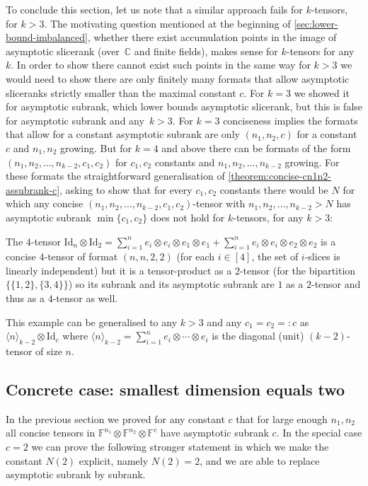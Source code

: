 \documentclass{daj}
\newcommand{\FF}{\mathbb{F}}
\newcommand{\CC}{\mathbb{C}}
\newcommand{\id}{\mathrm{Id}}
\begin{document}
\begin{remark}
    To conclude this section, let us note that a similar approach fails for $k$-tensors, for $k>3$. The motivating question mentioned at the beginning of \autoref{sec:lower-bound-imbalanced}, whether there exist accumulation points in the image of asymptotic slicerank (over~$\CC$ and finite fields), makes sense for $k$-tensors for any $k$. In order to show there cannot exist such points in the same way for $k>3$ we would need to show there are only finitely many formats that allow asymptotic sliceranks strictly smaller than the maximal constant $c$. For $k=3$ we showed it for asymptotic subrank, which lower bounds asymptotic slicerank, but this is false for asymptotic subrank and any~$k>3$. For $k=3$ conciseness implies the formats that allow for a constant asymptotic subrank are only $(n_1,n_2,c)$ for a constant $c$ and $n_1,n_2$ growing. But for $k=4$ and above there can be formats of the form $(n_1,n_2,\dots,n_{k-2},c_1,c_2)$ for $c_1,c_2$ constants and $n_1,n_2,\dots,n_{k-2}$ growing. For these formats the straightforward generalisation 
    of \autoref{theorem:concise-cn1n2-assubrank-c}, asking to show that for every $c_1,c_2$ constants there would be $N$ for which any concise $(n_1,n_2,\dots,n_{k-2},c_1,c_2)$-tensor with $n_1,n_2,\dots,n_{k-2}>N$ has asymptotic subrank $\min\{c_1,c_2\}$ does not hold for $k$-tensors, for any $k>3$:
    
    The $4$-tensor $\id_n\otimes \id_2=\sum_{i=1}^n e_i\otimes e_i\otimes e_1\otimes e_1+\sum_{i=1}^n e_i\otimes e_i\otimes e_2\otimes e_2$ is a concise $4$-tensor of format $(n,n,2,2)$ (for each $i\in[4]$, the set of $i$-slices is linearly independent) but it is a tensor-product as a $2$-tensor (for the bipartition $\{\{1,2\},\{3,4\}\}$) so its subrank and its asymptotic subrank are $1$ as a $2$-tensor and thus as a $4$-tensor as well.
    
    This example can be generalised to any $k>3$ and any $c_1=c_2=:c$ as $\langle n\rangle_{k-2}\otimes \id_c$ where $\langle n\rangle_{k-2}=\sum_{i=1}^n e_i\otimes\cdots\otimes e_i$ is the diagonal (unit) $(k-2)$-tensor of size $n$.
\end{remark}


\subsection{Concrete case: smallest dimension equals two} %
\label{subsec:dimtwo}

In the previous section we proved for any constant $c$ that for large enough $n_1,n_2$ all concise tensors in $\FF^{n_1} \otimes \FF^{n_2} \otimes \FF^c$ have asymptotic subrank $c$. In the special case $c=2$ we can prove the following stronger statement in which we make the constant $N(2)$ explicit, namely $N(2) = 2$, and we are able to replace asymptotic subrank by subrank.
%
\end{document}
